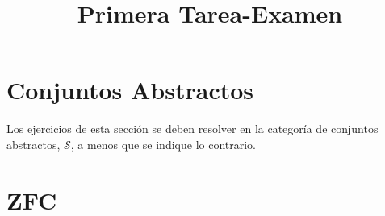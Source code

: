 \documentclass[10pt]{article}
\title{Primera Tarea-Examen}
\author{}
\date{}
\newcommand{\topos}[1]{\mathscr{#1}}
\begin{document}
    \maketitle

    \section*{Conjuntos Abstractos}
    Los ejercicios de esta sección se deben resolver en la categoría de
    conjuntos abstractos, \(\topos{S}\), a menos que se indique lo contrario.

    
    

    \section*{ZFC}
    
\end{document}
